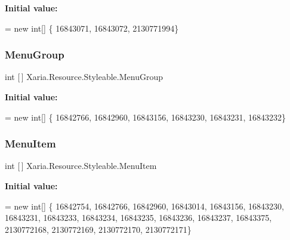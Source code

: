 {\bfseries Initial value\+:}
\begin{DoxyCode}
= \textcolor{keyword}{new} \textcolor{keywordtype}{int}[] \{
                    16843071,
                    16843072,
                    2130771994\}
\end{DoxyCode}
\mbox{\label{classXaria_1_1Resource_1_1Styleable_a66d651d1d6854927c1cdf49168f1ab8d}} 
\subsubsection{\texorpdfstring{Menu\+Group}{MenuGroup}}
{\footnotesize\ttfamily int \mbox{[}$\,$\mbox{]} Xaria.\+Resource.\+Styleable.\+Menu\+Group\hspace{0.3cm}{\ttfamily [static]}}

{\bfseries Initial value\+:}
\begin{DoxyCode}
= \textcolor{keyword}{new} \textcolor{keywordtype}{int}[] \{
                    16842766,
                    16842960,
                    16843156,
                    16843230,
                    16843231,
                    16843232\}
\end{DoxyCode}
\mbox{\label{classXaria_1_1Resource_1_1Styleable_a70a135c8709125f33ed3c7f8c67783bc}} 
\subsubsection{\texorpdfstring{Menu\+Item}{MenuItem}}
{\footnotesize\ttfamily int \mbox{[}$\,$\mbox{]} Xaria.\+Resource.\+Styleable.\+Menu\+Item\hspace{0.3cm}{\ttfamily [static]}}

{\bfseries Initial value\+:}
\begin{DoxyCode}
= \textcolor{keyword}{new} \textcolor{keywordtype}{int}[] \{
                    16842754,
                    16842766,
                    16842960,
                    16843014,
                    16843156,
                    16843230,
                    16843231,
                    16843233,
                    16843234,
                    16843235,
                    16843236,
                    16843237,
                    16843375,
                    2130772168,
                    2130772169,
                    2130772170,
                    2130772171\}
\end{DoxyCode}
\mbox{\label{classXaria_1_1Resource_1_1Styleable_a0876e9b1bd7429f95844961e9b252f4d}} 
